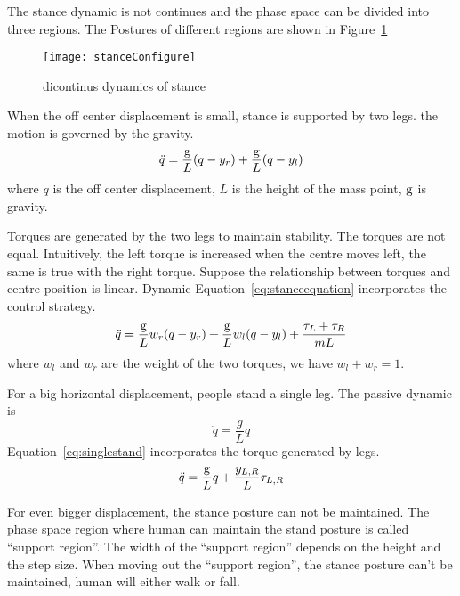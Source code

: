 The stance dynamic is not continues and the phase space can be divided into three regions.
The Postures of different regions are shown in Figure~\ref{fig:phaseregionsofstance}

\begin{figure}[!htbp]
  \begin{center}
     \texttt{[image: stanceConfigure]}
    \caption{dicontinus dynamics of stance}
    \label{fig:phaseregionsofstance}
\end{center}
\end{figure}


\begin{itemize}
When the off center  displacement  is small, stance is supported by two legs.
the motion is governed by the gravity.
\[
\ddot{q}=\frac{\mathrm{g}}{L}(q-y_r)+\frac{\mathrm{g}}{L}(q-y_l)
\]
where $q$ is the off center displacement,
$L$ is the height of the mass point,
$\mathrm{g}$ is gravity.



Torques are generated by the two legs to maintain stability.
The torques are not equal.
Intuitively, the left torque is increased when the centre moves left, the same is true with the right torque.
Suppose the relationship between torques and centre position is linear.
Dynamic Equation~\ref{eq:stanceequation} incorporates the control strategy.
\begin{equation}
\label{eq:stanceequation}
\ddot{q}=\frac{\mathrm{g}}{L}w_r(q-y_r)+\frac{\mathrm{g}}{L}w_l(q-y_l)+\frac{\tau_L+\tau_R}{mL}
\end{equation}
where $w_l$ and $w_r$ are the weight of the two torques, we have $w_l+w_r=1$.


For a big horizontal  displacement,  people stand a single leg.
The passive dynamic is
\[
\ddot{q}=\frac{g}{L}q
\]
Equation~\ref{eq:singlestand} incorporates the torque generated by legs.
\begin{equation}
\label{eq:singlestand}
\ddot{q}=\frac{\mathrm{g}}{L}q+\frac{y_{L,R}}{L}\tau_{L,R}
\end{equation}

For even bigger displacement,  the stance posture can not be maintained.
The phase space region where human can maintain the stand posture is called ``support region''.
The width of the ``support region'' depends on the  height and the step size.
When moving out the ``support region'', the stance posture can't be maintained, human will either walk or fall.
\end{itemize}







